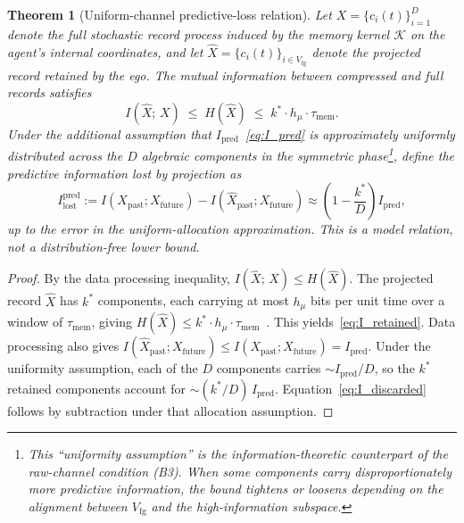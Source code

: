 \documentclass[12pt]{article}
\newtheorem{theorem}{Theorem}
\begin{document}
\begin{theorem}[Uniform-channel predictive-loss relation]
\label{thm:tradeoff}
Let $X = \{c_i(t)\}_{i=1}^{D}$ denote the full stochastic
record process induced by the memory kernel $\mathcal{K}$
on the agent's internal coordinates, and let
$\hat{X} = \{c_i(t)\}_{i \in V_{\mathrm{fg}}}$ denote the
projected record retained by the ego.
The mutual information between compressed and full records satisfies
\begin{equation}
\label{eq:I_retained}
I(\hat{X};\,X) \;\leq\; H(\hat{X})
\;\leq\; k^* \cdot h_\mu \cdot \tau_{\mathrm{mem}}.
\end{equation}
Under the additional assumption that
$I_{\mathrm{pred}}$~\eqref{eq:I_pred} is approximately
uniformly distributed across the $D$ algebraic components
in the symmetric phase\footnote{%
This ``uniformity assumption'' is the information-theoretic
counterpart of the raw-channel condition (B3).
When some components carry disproportionately more predictive
information, the bound tightens or loosens depending on the
alignment between $V_{\mathrm{fg}}$ and the high-information
subspace.},
define the predictive information lost by projection as
\begin{equation}
\label{eq:I_discarded}
I_{\mathrm{lost}}^{\mathrm{pred}}
:= I(X_{\mathrm{past}};X_{\mathrm{future}})
-I(\hat X_{\mathrm{past}};X_{\mathrm{future}})
\approx \left(1 - \frac{k^*}{D}\right) I_{\mathrm{pred}},
\end{equation}
up to the error in the uniform-allocation approximation.  This is a
model relation, not a distribution-free lower bound.
\end{theorem}

\begin{proof}
By the data processing inequality,
$I(\hat{X};\,X) \leq H(\hat{X})$.
The projected record $\hat{X}$ has $k^*$ components,
each carrying at most $h_\mu$ bits per unit time over a
window of $\tau_{\mathrm{mem}}$, giving
$H(\hat{X}) \leq k^* \cdot h_\mu \cdot
\tau_{\mathrm{mem}}$~\cite{CoverThomas2006}.
This yields~\eqref{eq:I_retained}.
Data processing also gives
$I(\hat X_{\mathrm{past}};X_{\mathrm{future}})\leq
I(X_{\mathrm{past}};X_{\mathrm{future}})=I_{\mathrm{pred}}$.
Under the uniformity assumption, each of the $D$ components
carries $\sim I_{\mathrm{pred}}/D$, so the $k^*$ retained
components account for $\sim (k^*/D)\,I_{\mathrm{pred}}$.
Equation~\eqref{eq:I_discarded} follows by subtraction under that
allocation assumption.
\end{proof}
\end{document}
